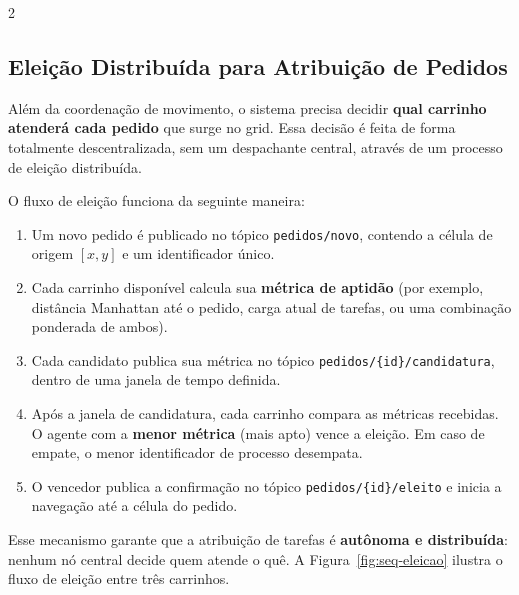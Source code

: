\documentclass[a4paper]{article}
\begin{document}
\begin{multicols}{2}
\setlength{\columnsep}{0.5cm}

\subsection{Elei\c{c}\~ao Distribu\'ida para Atribui\c{c}\~ao de Pedidos}

Al\'em da coordena\c{c}\~ao de movimento, o sistema precisa decidir \textbf{qual carrinho atender\'a cada pedido} que surge no grid. Essa decis\~ao \'e feita de forma totalmente descentralizada, sem um despachante central, atrav\'es de um processo de elei\c{c}\~ao distribu\'ida.

O fluxo de elei\c{c}\~ao funciona da seguinte maneira:

\begin{enumerate}
    \item Um novo pedido \'e publicado no t\'opico \texttt{pedidos/novo}, contendo a c\'elula de origem $[x, y]$ e um identificador \'unico.
    \item Cada carrinho dispon\'ivel calcula sua \textbf{m\'etrica de aptid\~ao} (por exemplo, dist\^ancia Manhattan at\'e o pedido, carga atual de tarefas, ou uma combina\c{c}\~ao ponderada de ambos).
    \item Cada candidato publica sua m\'etrica no t\'opico \texttt{pedidos/\{id\}/candidatura}, dentro de uma janela de tempo definida.
    \item Ap\'os a janela de candidatura, cada carrinho compara as m\'etricas recebidas. O agente com a \textbf{menor m\'etrica} (mais apto) vence a elei\c{c}\~ao. Em caso de empate, o menor identificador de processo desempata.
    \item O vencedor publica a confirma\c{c}\~ao no t\'opico \texttt{pedidos/\{id\}/eleito} e inicia a navega\c{c}\~ao at\'e a c\'elula do pedido.
\end{enumerate}

Esse mecanismo garante que a atribui\c{c}\~ao de tarefas \'e \textbf{aut\^onoma e distribu\'ida}: nenhum n\'o central decide quem atende o qu\^e. A Figura~\ref{fig:seq-eleicao} ilustra o fluxo de elei\c{c}\~ao entre tr\^es carrinhos.

\end{multicols}
\end{document}
